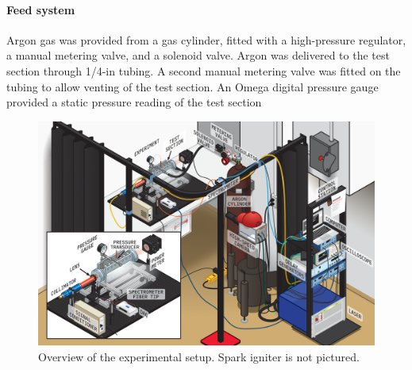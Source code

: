                 \paragraph{Feed system} Argon gas was provided from a gas cylinder, fitted with a high-pressure regulator, a manual metering valve, and a solenoid valve. Argon was delivered to the test section through 1/4-in tubing. A second manual metering valve was fitted on the tubing to allow venting of the test section. An Omega digital pressure gauge provided a static pressure reading of the test section

                \begin{figure}[h]
                    \centering
                    \includegraphics[width=\textwidth]{assets/3 design/setup_isometric.png}
                    \caption[Overview of the experimental setup]{Overview of the experimental setup. Spark igniter is not pictured.}
                    \label{fig:setupPhoto}
                \end{figure}

